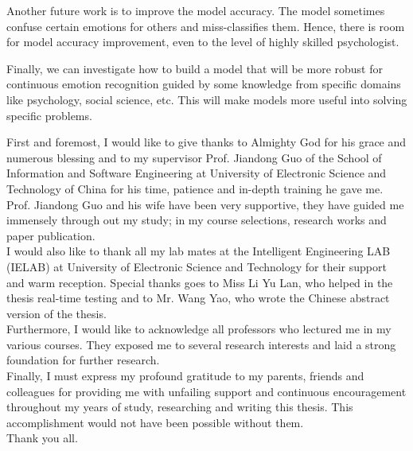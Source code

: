 \documentclass[master]{thesis-uestc}
\begin{document}
Another future work is to improve the model accuracy. The model sometimes confuse certain emotions for others and miss-classifies them. Hence, there is room for model accuracy improvement, even to the level of highly skilled psychologist.

Finally, we can investigate how to build a model that will be more robust for continuous emotion recognition guided by some knowledge from specific domains like psychology, social science, etc. This will make models more useful into solving specific problems.

\thesisacknowledgement
First and foremost, I would like to give thanks to Almighty God for his grace and numerous blessing and to my supervisor Prof. Jiandong Guo of the School of Information and Software Engineering at University of Electronic Science and Technology of China for his time, patience and in-depth training he gave me. Prof. Jiandong Guo and his wife have been very supportive, they have guided me immensely through out my study; in my course selections, research works and paper publication.\\
I would also like to thank all my lab mates at the Intelligent Engineering LAB (IELAB) at University of Electronic Science and Technology for their support and warm reception. Special thanks goes to Miss Li Yu Lan, who helped in the thesis real-time testing and to Mr. Wang Yao, who wrote the Chinese abstract version of the thesis.\\
Furthermore, I would like to acknowledge all professors who lectured me in my various courses. They exposed me to several research interests and laid a strong foundation for further research.\\
Finally, I must express my profound gratitude to my parents, friends and colleagues for providing me with unfailing support and continuous encouragement throughout my years of study, researching and writing this thesis. This accomplishment would not have been possible without them. \\
Thank you all.



%
% 
%


%


\printglossary

\end{document}
